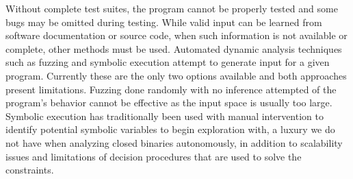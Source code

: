 \documentclass{sig-alternate-05-2015}
\begin{document}
Without complete test suites, the program cannot be properly tested and some bugs may be omitted during testing.
While valid input can be learned from software documentation or source code, when such information is not available or complete, other methods must be used.
Automated dynamic analysis techniques such as fuzzing and symbolic execution attempt to generate input for a given program.
Currently these are the only two options available and both approaches present limitations.
Fuzzing done randomly with no inference attempted of the program's behavior cannot be effective as the input space is usually too large.
Symbolic execution has traditionally been used with manual intervention to identify potential symbolic variables to begin exploration with, a luxury we do not have when analyzing closed binaries autonomously, in addition to scalability issues and limitations of decision procedures that are used to solve the constraints.
\end{document}
